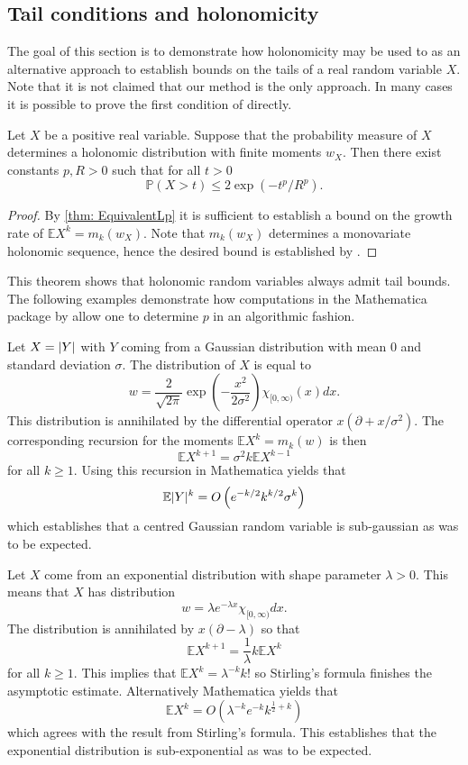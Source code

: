 \subsection{Tail conditions and holonomicity}
The goal of this section is to demonstrate how holonomicity may be used to as an alternative approach to establish bounds on the tails of a real random variable $X$.
Note that it is not claimed that our method is the only approach.
In many cases it is possible to prove the first condition of  directly.
\begin{theorem}
    Let $X$ be a positive real variable. Suppose that the probability measure of $X$ determines a holonomic distribution with finite moments $w_X$. 
    Then there exist constants $p,R>0$ such that for all $t>0$ 
    $$\mathbb{P}(X>t)\leq 2\exp(-t^p/R^p).$$
\end{theorem}
\begin{proof}
    By \cref{thm: EquivalentLp} it is sufficient to establish a bound on the growth rate of $\mathbb{E}X^k = m_k(w_X)$. 
    Note that $m_k(w_X)$ determines a monovariate holonomic sequence, hence the desired bound is established by .
\end{proof}
This theorem shows that holonomic random variables always admit tail bounds. 
The following examples demonstrate how computations in the Mathematica package by \cite{kauers2011mathematica} allow one to determine $p$ in an algorithmic fashion.
\begin{example}
  Let $X=\vert Y \vert$ with $Y$ coming from a Gaussian distribution with mean $0$ and standard deviation $\sigma$.
  The distribution of $X$ is equal to
  $$w = \frac{2}{\sqrt{2\pi}}\exp\left(-\frac{x^2}{2\sigma^2}\right)\chi_{[0,\infty)}(x)dx.$$
  This distribution is annihilated by the differential operator $x(\partial + x/\sigma^2).$
  The corresponding recursion for the moments $\mathbb{E}X^k = m_k(w)$ is then
  $$\mathbb{E}X^{k+1}= \sigma^2 k\mathbb{E}X^{k-1} $$
  for all $k\geq 1$.
  Using this recursion in Mathematica yields that
  $$\mathbb{E}\vert Y \vert^{k} = O\left(e^{-k/2}k^{k/2}\sigma^k\right) $$
  which establishes that a centred Gaussian random variable is sub-gaussian as was to be expected.
\end{example}
\begin{example}
  Let $X$ come from an exponential distribution with shape parameter $\lambda>0$.
  This means that $X$ has distribution
  $$w =  \lambda e^{-\lambda x} \chi_{[0,\infty)} dx.$$
  The distribution is annihilated by $x(\partial - \lambda )$ so that
  $$\mathbb{E}X^{k+1}= \frac{1}{\lambda}k\mathbb{E}X^k$$
  for all $k\geq 1$.
  This implies that $\mathbb{E}X^k = \lambda^{-k}k!$ so Stirling's formula finishes the asymptotic estimate.
  Alternatively Mathematica yields that
  $$\mathbb{E}X^k = O(\lambda^{-k}e^{-k}k^{\frac{1}{2} + k}) $$
  which agrees with the result from Stirling's formula.
  This establishes that the exponential distribution is sub-exponential as was to be expected.
\end{example}
